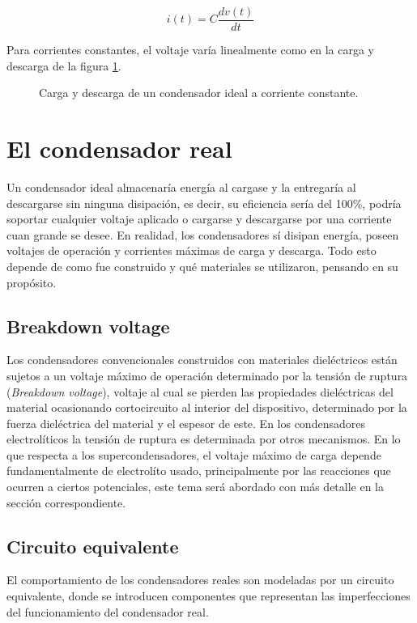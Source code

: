 \begin{equation}
	i(t) = C \frac{dv(t)}{dt}
\end{equation}

Para corrientes constantes, el voltaje varía linealmente como en la carga y descarga de la figura \ref{fig:plot:charge-discharge_ideal_cap}.
\begin{figure}[h!]
	\caption{Carga y descarga de un condensador ideal a corriente constante.}
	\label{fig:plot:charge-discharge_ideal_cap}
\end{figure}

\section{El condensador real}
Un condensador ideal almacenaría energía al cargase y la entregaría al descargarse sin ninguna disipación, es decir, su eficiencia sería del 100\%, podría soportar cualquier voltaje aplicado o cargarse y descargarse por una corriente cuan grande se desee.  En realidad, los condensadores sí disipan energía, poseen voltajes de operación y corrientes máximas de carga y descarga. Todo esto depende de como fue construido y qué materiales se utilizaron, pensando en su propósito.

\subsection{Breakdown voltage}
Los condensadores convencionales construidos con materiales dieléctricos están sujetos a un voltaje máximo de operación determinado por la tensión de ruptura (\textit{Breakdown voltage}), voltaje al cual se pierden las propiedades dieléctricas del material ocasionando cortocircuito al interior del dispositivo, determinado por la fuerza dieléctrica del material y el espesor de este. En los condensadores electrolíticos la tensión de ruptura es determinada por otros mecanismos\citep{Yahalom1971}. En lo que respecta a los supercondensadores, el voltaje máximo de carga depende fundamentalmente de electrolíto usado, principalmente por las reacciones que ocurren a ciertos potenciales, este tema será abordado con más detalle en la sección correspondiente.

\subsection{Circuito equivalente}
El comportamiento de los condensadores reales son modeladas por un circuito equivalente, donde se introducen componentes que representan las imperfecciones del funcionamiento del condensador real.\\


